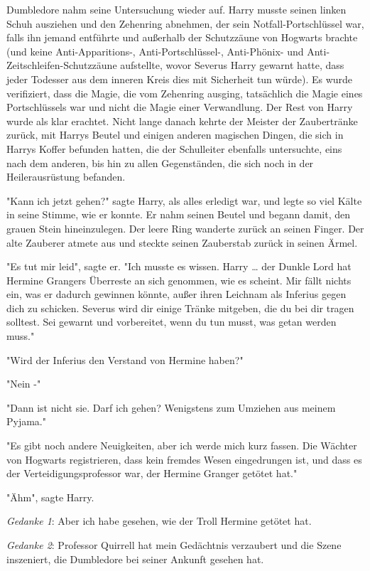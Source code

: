 {Dumbledore nahm seine Untersuchung wieder auf. Harry musste seinen linken Schuh ausziehen und den Zehenring abnehmen, der sein Notfall-Portschlüssel war, falls ihn jemand entführte und außerhalb der Schutzzäune von Hogwarts brachte (und keine Anti-Apparitions-, Anti-Portschlüssel-, Anti-Phönix- und Anti-Zeitschleifen-Schutzzäune aufstellte, wovor Severus Harry gewarnt hatte, dass jeder Todesser aus dem inneren Kreis dies mit Sicherheit tun würde). Es wurde verifiziert, dass die Magie, die vom Zehenring ausging, tatsächlich die Magie eines Portschlüssels war und nicht die Magie einer Verwandlung. Der Rest von Harry wurde als klar erachtet. Nicht lange danach kehrte der Meister der Zaubertränke zurück, mit Harrys Beutel und einigen anderen magischen Dingen, die sich in Harrys Koffer befunden hatten, die der Schulleiter ebenfalls untersuchte, eins nach dem anderen, bis hin zu allen Gegenständen, die sich noch in der Heilerausrüstung befanden.

"Kann ich jetzt gehen?" sagte Harry, als alles erledigt war, und legte so viel Kälte in seine Stimme, wie er konnte. Er nahm seinen Beutel und begann damit, den grauen Stein hineinzulegen. Der leere Ring wanderte zurück an seinen Finger. Der alte Zauberer atmete aus und steckte seinen Zauberstab zurück in seinen Ärmel.

"Es tut mir leid", sagte er. "Ich musste es wissen. Harry … der Dunkle Lord hat Hermine Grangers Überreste an sich genommen, wie es scheint. Mir fällt nichts ein, was er dadurch gewinnen könnte, außer ihren Leichnam als Inferius gegen dich zu schicken. Severus wird dir einige Tränke mitgeben, die du bei dir tragen solltest. Sei gewarnt und vorbereitet, wenn du tun musst, was getan werden muss."

"Wird der Inferius den Verstand von Hermine haben?"

"Nein -"

"Dann ist nicht sie. Darf ich gehen? Wenigstens zum Umziehen aus meinem Pyjama."

"Es gibt noch andere Neuigkeiten, aber ich werde mich kurz fassen. Die Wächter von Hogwarts registrieren, dass kein fremdes Wesen eingedrungen ist, und dass es der Verteidigungsprofessor war, der Hermine Granger getötet hat."

"Ähm", sagte Harry.

\emph{Gedanke 1}: Aber ich habe gesehen, wie der Troll Hermine getötet hat.

\emph{Gedanke 2}: Professor Quirrell hat mein Gedächtnis verzaubert und die Szene inszeniert, die Dumbledore bei seiner Ankunft gesehen hat.

}
